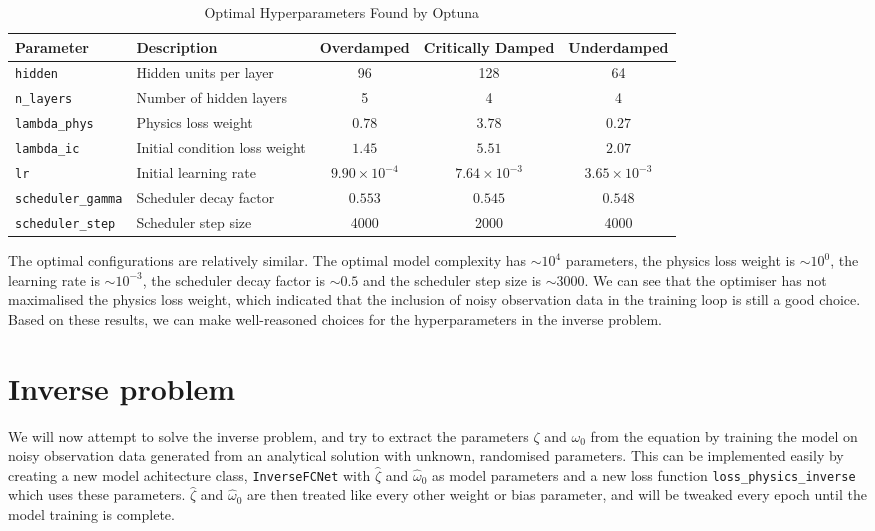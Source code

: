 \documentclass[we,twoside,openright,a4paper,11pt]{uantwerpenbamathesis}
\begin{document}
\begin{table}[H]
\centering
\caption{Optimal Hyperparameters Found by Optuna}\label{tab:optuna_best_params}
\begin{tabular}{llccc}
\toprule
\textbf{Parameter} & \textbf{Description} & \textbf{Overdamped} & \textbf{Critically Damped} & \textbf{Underdamped} \\
\midrule
\texttt{hidden}           & Hidden units per layer        & 96     & 128    & 64     \\
\texttt{n\_layers}        & Number of hidden layers       & 5      & 4      & 4      \\
\texttt{lambda\_phys}     & Physics loss weight           & $0.78$ & $3.78$ & $0.27$ \\
\texttt{lambda\_ic}       & Initial condition loss weight & $1.45$ & $5.51$ & $2.07$ \\
\texttt{lr}               & Initial learning rate         & $9.90\times10^{-4}$ & $7.64\times10^{-3}$ & $3.65\times10^{-3}$ \\
\texttt{scheduler\_gamma} & Scheduler decay factor        & $0.553$ & $0.545$ & $0.548$ \\
\texttt{scheduler\_step}  & Scheduler step size           & 4000   & 2000   & 4000   \\
\bottomrule
\end{tabular}
\end{table}
The optimal configurations are relatively similar. The optimal model complexity has $\sim10^4$ parameters, the physics loss weight is $\sim10^0$, the learning rate is $\sim10^{-3}$, the scheduler decay factor is $\sim0.5$ and the scheduler step size is $\sim3000$. We can see that the optimiser has not maximalised the physics loss weight, which indicated that the inclusion of noisy observation data in the training loop is still a good choice. Based on these results, we can make well-reasoned choices for the hyperparameters in the inverse problem.
\section{Inverse problem}\label{ch:inverse_DHO}
We will now attempt to solve the inverse problem, and try to extract the parameters $\zeta$ and $\omega_0$ from the equation by training the model on noisy observation data generated from an analytical solution with unknown, randomised parameters. This can be implemented easily by creating a new model achitecture class, \verb|InverseFCNet| with $\hat\zeta$ and $\hat\omega_0$ as model parameters and a new loss function \verb|loss_physics_inverse| which uses these parameters. $\hat\zeta$ and $\hat\omega_0$ are then treated like every other weight or bias parameter, and will be tweaked every epoch until the model training is complete.\\
\end{document}

